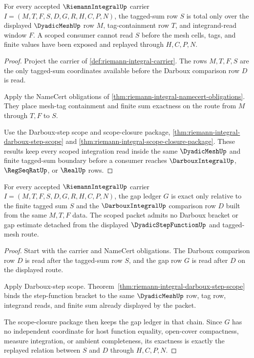 \begin{theorem}
\label{thm:riemann-integral-tagged-sum-totality}
For every accepted $\RiemannIntegralUp$ carrier $I=(M,T,F,S,D,G,R,H,C,P,N)$, the tagged-sum row $S$ is total only over the displayed $\DyadicMeshUp$ row $M$, tag-containment row $T$, and integrand-read window $F$. A scoped consumer cannot read $S$ before the mesh cells, tags, and finite values have been exposed and replayed through $H,C,P,N$.
\end{theorem}
\begin{proof}
Project the carrier of \autoref{def:riemann-integral-carrier}. The rows $M,T,F,S$ are the only tagged-sum coordinates available before the Darboux comparison row $D$ is read.

Apply the NameCert obligations of \autoref{thm:riemann-integral-namecert-obligations}. They place mesh-tag containment and finite sum exactness on the route from $M$ through $T,F$ to $S$.

Use the Darboux-step scope and scope-closure package, \autoref{thm:riemann-integral-darboux-step-scope} and \autoref{thm:riemann-integral-scope-closure-package}. These results keep every scoped integration read inside the same $\DyadicMeshUp$ and finite tagged-sum boundary before a consumer reaches $\DarbouxIntegralUp$, $\RegSeqRatUp$, or $\RealUp$ rows.
\end{proof}

\begin{theorem}
\label{thm:riemann-integral-darboux-gap-exactness}
For every accepted $\RiemannIntegralUp$ carrier $I=(M,T,F,S,D,G,R,H,C,P,N)$, the gap ledger $G$ is exact only relative to the finite tagged sum $S$ and the $\DarbouxIntegralUp$ comparison row $D$ built from the same $M,T,F$ data. The scoped packet admits no Darboux bracket or gap estimate detached from the displayed $\DyadicStepFunctionUp$ and tagged-mesh route.
\end{theorem}
\begin{proof}
Start with the carrier and NameCert obligations. The Darboux comparison row $D$ is read after the tagged-sum row $S$, and the gap row $G$ is read after $D$ on the displayed route.

Apply Darboux-step scope. Theorem~\ref{thm:riemann-integral-darboux-step-scope} binds the step-function bracket to the same $\DyadicMeshUp$ row, tag row, integrand reads, and finite sum already displayed by the packet.

The scope-closure package then keeps the gap ledger in that chain. Since $G$ has no independent coordinate for host function equality, open-cover compactness, measure integration, or ambient completeness, its exactness is exactly the replayed relation between $S$ and $D$ through $H,C,P,N$.
\end{proof}

